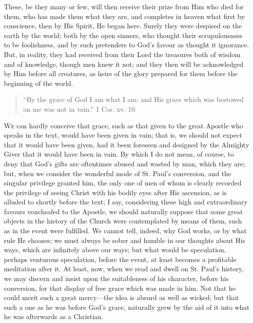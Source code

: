 These, be they many or few, will then receive their prize from Him
who died for them, who has made them what they are, and completes in
heaven what first by conscience, then by His Spirit, He began here.
Surely they were despised on the earth by the world; both by the open
sinners, who thought their scrupulousness to be foolishness, and by
such pretenders to God's favour as thought it ignorance. But, in
reality, they had received from their Lord the treasures both of
wisdom and of knowledge, though men knew it not; and they then will be
acknowledged by Him before all creatures, as heirs of the glory
prepared for them before the beginning of the world.


\begin{quote}

``By the grace of God I am what I am: and His grace which was
bestowed on me was not in vain.'' 1 Cor. xv. 10.

\end{quote}

W\textsc{e} can hardly conceive that grace, such as that given to the great
Apostle who speaks in the text, would have been given in vain; that
is, we should not expect that it would have been given, had it been
foreseen and designed by the Almighty Giver that it would have been in
vain. By which I do not mean, of course, to deny that God's gifts are
oftentimes abused and wasted by man, which they are; but, when we
consider the wonderful mode of St. Paul's conversion, and the singular
privilege granted him, the only one of men of whom is clearly recorded
the privilege of seeing Christ with his bodily eyes after His
ascension, as is alluded to shortly before the text; I say,
considering these high and extraordinary favours vouchsafed to the
Apostle, we should naturally suppose that some great objects in the
history of the Church were contemplated by means of them, such as in
the event were fulfilled. We cannot tell, indeed, why God works, or by
what rule He chooses; we must always be sober and humble in our
thoughts about His ways, which are infinitely above our ways; but what
would be speculation, perhaps venturous speculation, before the event,
at least becomes a profitable meditation after it. At least, now, when
we read and dwell on St. Paul's history, we may discern and insist
upon the suitableness of his character, before his conversion, for
that display of free grace which was made in him. Not that he could
merit such a great mercy—the idea is absurd as well as wicked; but
that such a one as he was before God's grace, naturally grew by the
aid of it into what he was afterwards as a Christian.

